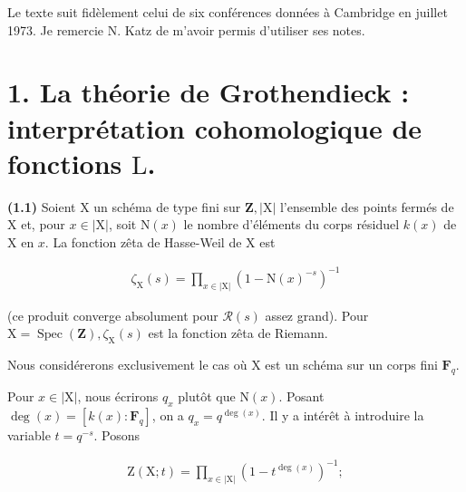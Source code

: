 \documentclass[10pt,leqno]{article}
\begin{document}
\noindent Le texte suit fidèlement celui de six conférences données à Cambridge en juillet 1973. Je remercie \(\mathrm{N}\). Katz de m’avoir permis d’utiliser ses notes.\par

\section*{1. La théorie de Grothendieck : interprétation cohomologique de fonctions \(\mathrm{L}\).}

\noindent \textbf{(1.1)} Soient \(\mathrm{X}\) un schéma de type fini sur \(\mathbf{Z}, |\mathrm{X}|\) l’ensemble des points fermés de \(\mathrm{X}\) et, pour \(x\in |\mathrm{X}|\), soit \(\mathrm{N}(x)\) le nombre d’éléments du corps résiduel \(k(x)\) de \(\mathrm{X}\) en \(x\). La fonction zêta de Hasse-Weil de \(\mathrm{X}\) est\par

\begin{equation*}\begin{gathered}\zeta _{\mathrm{X}}(s) = \prod _{x\in |\mathrm{X}|} (1 -  \mathrm{N}(x)^{- s})^{- 1}\end{gathered}\tag{1.1.1}\end{equation*}

\noindent (ce produit converge absolument pour \(\mathcal{R} (s)\) assez grand). Pour \(\mathrm{X} = \operatorname{Spec}(\mathbf{Z}), \zeta _{\mathrm{X}}(s)\) est la fonction zêta de Riemann.\par

\noindent Nous considérerons exclusivement le cas où \(\mathrm{X}\) est un schéma sur un corps fini \(\mathbf{F}_{q}\).\par

\clearpage

\label{physical-3}

\noindent Pour \(x\in |\mathrm{X}|\), nous écrirons \(q_{x}\) plutôt que \(\mathrm{N}(x)\). Posant \(\operatorname{deg}(x)=[k(x):\mathbf{F}_{q}]\), on a \(q_{x}=q^{\operatorname{deg}(x)}\). Il y a intérêt à introduire la variable \(t=q^{- s}\). Posons\par

\begin{equation*}\begin{gathered}\mathrm{Z}(\mathrm{X}; t) = \prod _{x\in |\mathrm{X}|} (1 -  t^{\operatorname{deg}(x)})^{- 1} ;\end{gathered}\tag{1.1.2}\end{equation*}
\end{document}

